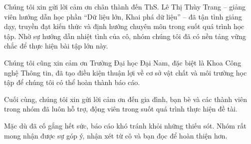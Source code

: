 

\thesislayout


\coverpage

\frontmatter

\newpage

\begin{acknowledgments}

Chúng tôi xin gửi lời cảm ơn chân thành đến ThS. Lê Thị Thùy Trang -- giảng viên hướng dẫn học phần ``Dữ liệu lớn, Khai phá dữ liệu'' -- đã tận tình giảng dạy, truyền đạt kiến thức và định hướng chuyên môn trong suốt quá trình học tập. Nhờ sự hướng dẫn nhiệt tình của cô, nhóm chúng tôi đã có nền tảng vững chắc để thực hiện bài tập lớn này.

Chúng tôi cũng xin cảm ơn Trường Đại học Đại Nam, đặc biệt là Khoa Công nghệ Thông tin, đã tạo điều kiện thuận lợi về cơ sở vật chất và môi trường học tập để chúng tôi có thể hoàn thành báo cáo.

Cuối cùng, chúng tôi xin gửi lời cảm ơn đến gia đình, bạn bè và các thành viên trong nhóm đã luôn hỗ trợ, động viên trong suốt quá trình thực hiện đề tài.

Mặc dù đã cố gắng hết sức, báo cáo khó tránh khỏi những thiếu sót. Nhóm rất mong nhận được sự góp ý, nhận xét từ cô và bạn đọc để hoàn thiện hơn.

\end{acknowledgments}

\tableofcontents
\listoftables
\listoffigures

\mainmatter
\fancyhead{}  %
\renewcommand{\footrulewidth}{0.4pt}
\pagestyle{fancy} 
\renewcommand{\chaptermark}[1]{\markboth{#1}{#1}}
\fancyhead[R]{\chaptername\ \thechapter\ --\ \leftmark}









 


